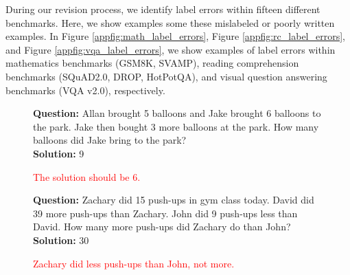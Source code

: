 During our revision process, we identify label errors within fifteen different benchmarks. Here, we show examples some these mislabeled or poorly written examples. In Figure \ref{appfig:math_label_errors}, Figure \ref{appfig:rc_label_errors}, and Figure \ref{appfig:vqa_label_errors}, we show examples of label errors within mathematics benchmarks (GSM8K, SVAMP), reading comprehension benchmarks (SQuAD2.0, DROP, HotPotQA), and visual question answering benchmarks (VQA v2.0), respectively.

\vspace{1em}

\begin{figure}[h]
\centering

\begin{tcolorbox}[colback=gray!4, colframe=gray!50, arc=2mm, boxrule=0.5pt,left=9pt,right=9pt]
\small

\begin{minipage}{0.48\textwidth}
\begin{tcolorbox}[colback=white, colframe=gray!50, arc=2mm, boxrule=0.5pt, title={Mislabeled question, \textit{SVAMP}}, coltitle=black, colbacktitle=gray!10]
\textbf{Question:} Allan brought 5 balloons and Jake brought 6 balloons to the park. Jake then bought 3 more balloons at the park. How many balloons did Jake bring to the park?
\\
\textbf{Solution:} 9
\end{tcolorbox}
\begin{adjustwidth}{1.4em}{0pt} \textcolor{red}{The solution should be 6.}
\end{adjustwidth}\end{minipage}
\hfill
\begin{minipage}{0.48\textwidth}
    \begin{tcolorbox}[colback=white, colframe=gray!50, arc=2mm, boxrule=0.5pt, title={Logical contradiction, \textit{SVAMP}}, coltitle=black, colbacktitle=gray!10]
\textbf{Question:} Zachary did 15 push-ups in gym class today. David did 39 more push-ups than Zachary. John did 9 push-ups less than David. How many more push-ups did Zachary do than John?
\\
\textbf{Solution:} 30
    \end{tcolorbox}
    \begin{adjustwidth}{1.4em}{0pt} \textcolor{red}{Zachary did less push-ups than John, not more.}
    \end{adjustwidth}
\end{minipage}
\vspace{1em}


\end{tcolorbox}
\end{figure}
